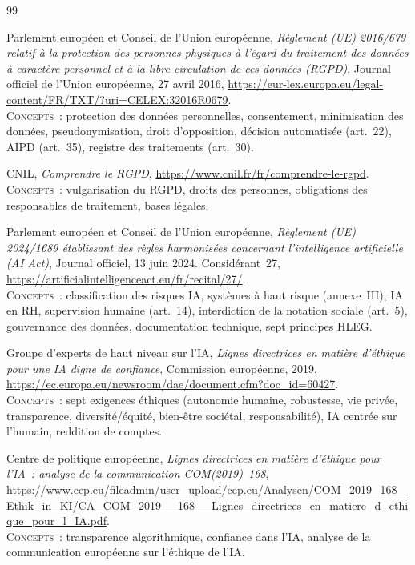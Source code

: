 \documentclass[12pt,a4paper]{article}
\begin{document}
\newpage
\begin{thebibliography}{99}


Parlement européen et Conseil de l'Union européenne, \textit{Règlement (UE) 2016/679 relatif à la protection des personnes physiques à l'égard du traitement des données à caractère personnel et à la libre circulation de ces données (RGPD)}, Journal officiel de l'Union européenne, 27 avril 2016,
\url{https://eur-lex.europa.eu/legal-content/FR/TXT/?uri=CELEX:32016R0679}.
\\[2pt] {\small \textsc{Concepts~:} protection des données personnelles, consentement, minimisation des données, pseudonymisation, droit d'opposition, décision automatisée (art.~22), AIPD (art.~35), registre des traitements (art.~30).}

CNIL, \textit{Comprendre le RGPD},
\url{https://www.cnil.fr/fr/comprendre-le-rgpd}.
\\[2pt] {\small \textsc{Concepts~:} vulgarisation du RGPD, droits des personnes, obligations des responsables de traitement, bases légales.}

Parlement européen et Conseil de l'Union européenne, \textit{Règlement (UE) 2024/1689 établissant des règles harmonisées concernant l'intelligence artificielle (AI Act)}, Journal officiel, 13 juin 2024. Considérant~27,
\url{https://artificialintelligenceact.eu/fr/recital/27/}.
\\[2pt] {\small \textsc{Concepts~:} classification des risques IA, systèmes à haut risque (annexe~III), IA en RH, supervision humaine (art.~14), interdiction de la notation sociale (art.~5), gouvernance des données, documentation technique, sept principes HLEG.}

Groupe d'experts de haut niveau sur l'IA, \textit{Lignes directrices en matière d'éthique pour une IA digne de confiance}, Commission européenne, 2019,
\url{https://ec.europa.eu/newsroom/dae/document.cfm?doc_id=60427}.
\\[2pt] {\small \textsc{Concepts~:} sept exigences éthiques (autonomie humaine, robustesse, vie privée, transparence, diversité/équité, bien-être sociétal, responsabilité), IA centrée sur l'humain, reddition de comptes.}

Centre de politique européenne, \textit{Lignes directrices en matière d'éthique pour l'IA~: analyse de la communication COM(2019)~168},
\url{https://www.cep.eu/fileadmin/user_upload/cep.eu/Analysen/COM_2019_168_Ethik_in_KI/CA_COM_2019__168__Lignes_directrices_en_matiere_d_ethique_pour_l_IA.pdf}.
\\[2pt] {\small \textsc{Concepts~:} transparence algorithmique, confiance dans l'IA, analyse de la communication européenne sur l'éthique de l'IA.}


\end{thebibliography}
\end{document}
